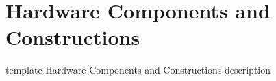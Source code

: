 \section{Hardware Components and Constructions}

template Hardware Components and Constructions description

